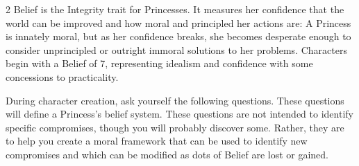\begin{multicols}{2}
Belief is the Integrity trait for Princesses. It measures her confidence that the world can be improved and how moral and principled her actions are: A Princess is innately moral, but as her confidence breaks, she becomes desperate enough to consider unprincipled or outright immoral solutions to her problems. Characters begin with a Belief of 7, representing idealism and confidence with some concessions to practicality. 

During character creation, ask yourself the following questions. These questions will define a Princess's belief system. These questions are not intended to identify specific compromises, though you will probably discover some. Rather, they are to help you create a moral framework that can be used to identify new compromises and which can be modified as dots of Belief are lost or gained. 


\end{multicols}
